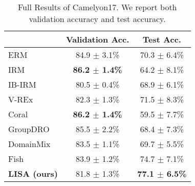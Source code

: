 \begin{table*}[h]
\small
\caption{Full Results of Camelyon17. We report both validation accuracy and test accuracy.}
\label{tab:camelyon_full}
\begin{center}
\begin{tabular}{l|cc}
\toprule
 & Validation Acc. & Test Acc.\\\midrule
ERM & 84.9 $\pm$ 3.1\% & 70.3 $\pm$ 6.4\%  \\
IRM  & \textbf{86.2 $\pm$ 1.4\%} & 64.2 $\pm$ 8.1\% \\
IB-IRM & 80.5 $\pm$ 0.4\% & 68.9 $\pm$ 6.1\% \\
V-REx  & 82.3 $\pm$ 1.3\% & 71.5 $\pm$ 8.3\% \\
Coral & \textbf{
86.2 $\pm$ 1.4\%} & 59.5 $\pm$ 7.7\% \\
GroupDRO & 85.5 $\pm$ 2.2\% & 68.4 $\pm$ 7.3\% \\
DomainMix & 83.5 $\pm$ 1.1\% & 69.7 $\pm$ 5.5\% \\
Fish & 83.9 $\pm$ 1.2\% & 74.7 $\pm$ 7.1\% \\
\midrule
\textbf{LISA (ours)} & 81.8 $\pm$ 1.3\% & \textbf{77.1 $\pm$ 6.5\%} \\
\bottomrule
\end{tabular}
\end{center}
\end{table*}

